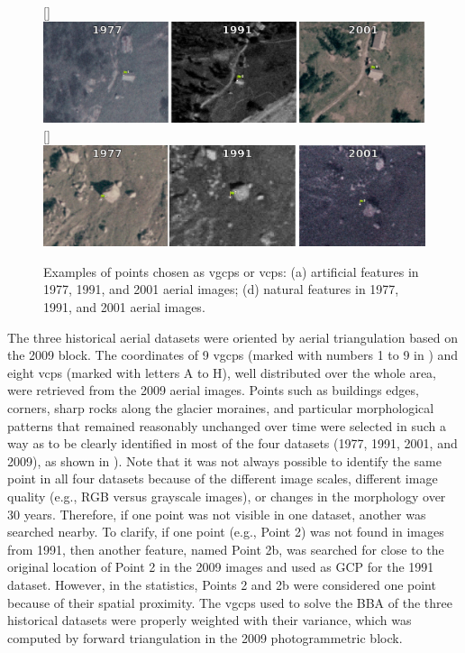 \begin{figure} [ht]
    \centering
    \subcaptionbox{\label{fig:2:gcp_examples:artificial}}[\textwidth]{
        \includegraphics[width=\textwidth]{artificial_gcps}
    } \\
    \subcaptionbox{\label{fig:2:gcp_examples:natural}}[\textwidth]{
        \includegraphics[width=\textwidth]{natural_gcps}
    }
    \caption{Examples of points chosen as \acp{vgcp} or \acp{vcp}: (a) artificial features in 1977, 1991, and 2001 aerial images; (d) natural features in 1977, 1991, and 2001 aerial images.}
    \label{fig:2:gcp_examples}
\end{figure}

The three historical aerial datasets were oriented by aerial triangulation based on the 2009 block.
The coordinates of 9 \acp{vgcp} (marked with numbers 1 to 9 in ) and eight \acp{vcp} (marked with letters A to H), well distributed over the whole area, were retrieved from the 2009 aerial images.
Points such as buildings edges, corners, sharp rocks along the glacier moraines, and particular morphological patterns that remained reasonably unchanged over time were selected in such a way as to be clearly identified in most of the four datasets (1977, 1991, 2001, and 2009), as shown in ).
Note that it was not always possible to identify the same point in all four datasets because of the different image scales, different image quality (e.g., RGB versus grayscale images), or changes in the morphology over 30 years. 
Therefore, if one point was not visible in one dataset, another was searched nearby.
To clarify, if one point (e.g., Point 2) was not found in images from 1991, then another feature, named Point 2b, was searched for close to the original location of Point 2 in the 2009 images and used as GCP for the 1991 dataset.
However, in the statistics, Points 2 and 2b were considered one point because of their spatial proximity.
The \acp{vgcp} used to solve the BBA of the three historical datasets were properly weighted with their variance, which was computed by forward triangulation in the 2009 photogrammetric block. 

